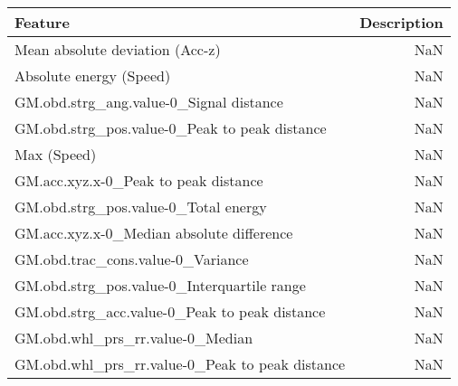 \begin{table}
\centering
\label{table:reg_fs}
\begin{tabular}{lr}
\toprule
                               \textbf{Feature} & \textbf{Description} \\
\midrule
                Mean absolute deviation (Acc-z) &                  NaN \\
                        Absolute energy (Speed) &                  NaN \\
        GM.obd.strg_ang.value-0_Signal distance &                  NaN \\
  GM.obd.strg_pos.value-0_Peak to peak distance &                  NaN \\
                                    Max (Speed) &                  NaN \\
           GM.acc.xyz.x-0_Peak to peak distance &                  NaN \\
           GM.obd.strg_pos.value-0_Total energy &                  NaN \\
      GM.acc.xyz.x-0_Median absolute difference &                  NaN \\
              GM.obd.trac_cons.value-0_Variance &                  NaN \\
    GM.obd.strg_pos.value-0_Interquartile range &                  NaN \\
  GM.obd.strg_acc.value-0_Peak to peak distance &                  NaN \\
               GM.obd.whl_prs_rr.value-0_Median &                  NaN \\
GM.obd.whl_prs_rr.value-0_Peak to peak distance &                  NaN \\
\bottomrule
\end{tabular}
\end{table}
